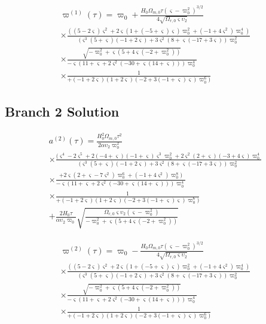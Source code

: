 \documentclass{article}
\begin{document}
\begin{multline}
\varpi^{(1)}(\tau) = \varpi_0 + \frac{H_0 \Omega_{m,0} \tau (\varsigma - \varpi_0^2)^{3/2}}{4 \sqrt{\Omega_{r,0} \varsigma \upsilon_2}} \\
\times \frac{((5 - 2 \varsigma) \varsigma^2 + 2 \varsigma (1 + (-5 + \varsigma) \varsigma) \varpi_0^2 + (-1 + 4 \varsigma^2) \varpi_0^4)}{(\varsigma^3 (5 + \varsigma)(-1 + 2 \varsigma) + 3 \varsigma^2 (8 + \varsigma(-17 + 3 \varsigma)) \varpi_0^2} \\
\times \frac{\sqrt{-\varpi_0^2 + \varsigma (5 + 4 \varsigma (-2 + \varpi_0^2))}}{- \varsigma (11 + \varsigma + 2 \varsigma^2 (-30 + \varsigma (14 + \varsigma))) \varpi_0^4} \\
\times \frac{1}{+ (-1 + 2 \varsigma)(1 + 2 \varsigma)(-2 + 3(-1 + \varsigma) \varsigma) \varpi_0^6)}
\end{multline}

\subsection{Branch 2 Solution}

\begin{multline}
a^{(2)}(\tau) = \frac{H_0^2 \Omega_{m,0} \tau^2}{2 \alpha \upsilon_2 \varpi_0^2} \\
\times \frac{(\varsigma^4 - 2 \varsigma^5 + 2(-4 + \varsigma)(-1 + \varsigma) \varsigma^3 \varpi_0^2 + 2 \varsigma^2 (2 + \varsigma)(-3 + 4 \varsigma) \varpi_0^4}{(\varsigma^3 (5 + \varsigma)(-1 + 2 \varsigma) + 3 \varsigma^2 (8 + \varsigma(-17 + 3 \varsigma)) \varpi_0^2} \\
\times \frac{+ 2 \varsigma (2 + \varsigma - 7 \varsigma^2) \varpi_0^6 + (-1 + 4 \varsigma^2) \varpi_0^8)}{- \varsigma (11 + \varsigma + 2 \varsigma^2 (-30 + \varsigma (14 + \varsigma))) \varpi_0^4} \\
\times \frac{1}{+ (-1 + 2 \varsigma)(1 + 2 \varsigma)(-2 + 3(-1 + \varsigma) \varsigma) \varpi_0^6)} \\
+ \frac{2 H_0 \tau}{\alpha \upsilon_2 \varpi_0} \sqrt{\frac{\Omega_{r,0} \varsigma \upsilon_2 (\varsigma - \varpi_0^2)}{-\varpi_0^2 + \varsigma (5 + 4 \varsigma (-2 + \varpi_0^2))}}
\end{multline}

\begin{multline}
\varpi^{(2)}(\tau) = \varpi_0 - \frac{H_0 \Omega_{m,0} \tau (\varsigma - \varpi_0^2)^{3/2}}{4 \sqrt{\Omega_{r,0} \varsigma \upsilon_2}} \\
\times \frac{((5 - 2 \varsigma) \varsigma^2 + 2 \varsigma (1 + (-5 + \varsigma) \varsigma) \varpi_0^2 + (-1 + 4 \varsigma^2) \varpi_0^4)}{(\varsigma^3 (5 + \varsigma)(-1 + 2 \varsigma) + 3 \varsigma^2 (8 + \varsigma(-17 + 3 \varsigma)) \varpi_0^2} \\
\times \frac{\sqrt{-\varpi_0^2 + \varsigma (5 + 4 \varsigma (-2 + \varpi_0^2))}}{- \varsigma (11 + \varsigma + 2 \varsigma^2 (-30 + \varsigma (14 + \varsigma))) \varpi_0^4} \\
\times \frac{1}{+ (-1 + 2 \varsigma)(1 + 2 \varsigma)(-2 + 3(-1 + \varsigma) \varsigma) \varpi_0^6)}
\end{multline}
\end{document}
